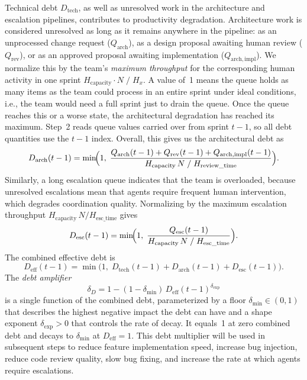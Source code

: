 \documentclass[smallextended]{svjour3}       %
\begin{document}
Technical debt $D_\mathrm{tech}$, as well as unresolved work in the architecture
and escalation pipelines, contributes to productivity degradation.
Architecture work is considered unresolved as long as it remains anywhere in
the pipeline: as an unprocessed change request ($Q_\mathrm{arch}$), as a design
proposal awaiting human review ($Q_\mathrm{rev}$), or as an approved proposal
awaiting implementation ($Q_\mathrm{arch,impl}$). We normalize this by the team's \emph{maximum throughput} for the
corresponding human activity in one sprint
$H_\mathrm{capacity} \cdot N \;/\; H_{x}$.
A value of~1 means the queue holds as many items as the team could process in
an entire sprint under ideal conditions, i.e., the team would need a full sprint just to drain the queue. Once the queue reaches this or a worse state, the architectural degradation has reached its maximum. Step~2 reads queue values carried over from sprint $t-1$, so all debt quantities use the $t-1$ index. Overall, this gives us the architectural debt as
\begin{equation}
  D_\mathrm{arch}(t-1) = \min\!\Bigl(1,\;
    \frac{Q_\mathrm{arch}(t-1) + Q_\mathrm{rev}(t-1) + Q_\mathrm{arch,impl}(t-1)}
         {H_\mathrm{capacity}\,N \;/\; H_\mathrm{review\_time}}\Bigr).
  \label{eq:D_arch}
\end{equation}
Similarly, a long escalation queue indicates that the team is overloaded, because unresolved
escalations mean that agents require frequent human intervention, which
degrades coordination quality.  Normalizing by the maximum escalation throughput
$H_\mathrm{capacity}\,N / H_\mathrm{esc\_time}$ gives
\begin{equation}
  D_\mathrm{esc}(t-1) = \min\!\Bigl(1,\;
    \frac{Q_\mathrm{esc}(t-1)}
         {H_\mathrm{capacity}\,N \;/\; H_\mathrm{esc\_time}}\Bigr).
  \label{eq:D_esc}
\end{equation}
The combined effective debt is
\begin{equation}
  D_\mathrm{eff}(t-1) = \min\!\bigl(1,\; D_\mathrm{tech}(t-1) + D_\mathrm{arch}(t-1) + D_\mathrm{esc}(t-1)\bigr).
  \label{eq:D_eff}
\end{equation}
The \emph{debt amplifier}
\begin{equation}
  \delta_D = 1 - (1 - \delta_\mathrm{min})\,D_\mathrm{eff}(t-1)^{\delta_\mathrm{exp}}
  \label{eq:delta_D}
\end{equation}
is a single function of the combined debt, parameterized by a floor
$\delta_\mathrm{min} \in (0,1)$ that describes the highest negative impact the debt can have and a shape exponent $\delta_\mathrm{exp} > 0$ that controls the rate of decay.
It equals~1 at zero combined debt and decays to $\delta_\mathrm{min}$ at
$D_\mathrm{eff} = 1$. This debt multiplier will be used in subsequent steps to reduce feature implementation speed, increase bug injection, reduce code review quality, slow bug fixing, and increase the rate at which agents require escalations.
\end{document}
